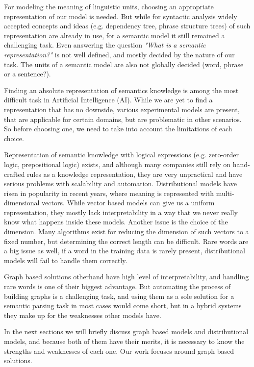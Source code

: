 For modeling the meaning of linguistic units, choosing an appropriate representation of our model is needed. But while for syntactic analysis widely accepted concepts and ideas (e.g. dependency tree, phrase structure trees) of such representation are already in use, for a semantic model it still remained a challenging task. Even answering the question \textit{"What is a semantic representation?"} is not well defined, and mostly decided by the nature of our task. The units of a semantic model are also not globally decided (word, phrase or a sentence?).

Finding an absolute representation of semantics knowledge is among the most difficult task in Artificial Intelligence (AI). While we are yet to find a representation that has no downside, various experimental models are present, that are applicable for certain domains, but are problematic in other scenarios. So before choosing one, we need to take into account the limitations of each choice. 


Representation of semantic knowledge with logical expressions (e.g. zero-order logic, prepositional logic) exists, and although many companies still rely on hand-crafted rules as a knowledge representation, they are very unpractical and have serious problems with scalability and automation. Distributional models have risen in popularity in recent years, where meaning is represented with multi-dimensional vectors. While vector based models can give us a uniform representation, they mostly lack interpretability in a way that we never really know what happens inside these models. Another issue is the choice of the dimension. Many algorithms exist for reducing the dimension of such vectors to a fixed number, but determining the correct length can be difficult. Rare words are a big issue as well, if a word in the training data is rarely present, distributional models will fail to handle them correctly.

Graph based solutions otherhand have high level of interpretability, and handling rare words is one of their biggest advantage. But automating the process of building graphs is a challenging task, and using them as a sole solution for a semantic parsing task in most cases would come short, but in a hybrid systems they make up for the weaknesses other models have.

 In the next sections we will briefly discuss graph based models and distributional models, and because both of them have their merits, it is necessary to know the strengths and weaknesses of each one. Our work focuses around graph based solutions.

